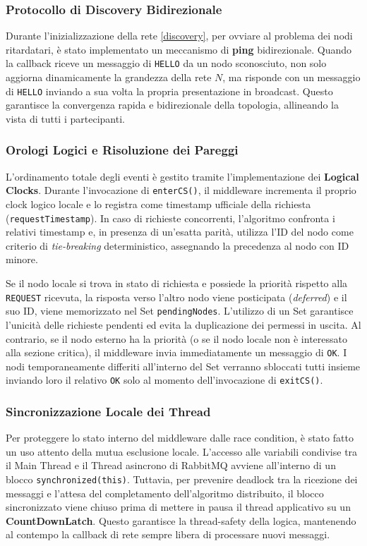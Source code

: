 \subsubsection{Protocollo di Discovery Bidirezionale}
Durante l'inizializzazione della rete \ref{discovery}, per ovviare al problema dei nodi ritardatari, è stato implementato un meccanismo di \textbf{ping} bidirezionale. 
Quando la callback riceve un messaggio di \texttt{HELLO} da un nodo sconosciuto, non solo aggiorna dinamicamente la grandezza della rete $N$, ma risponde con un messaggio di \texttt{HELLO} inviando a sua volta la propria presentazione in broadcast. Questo garantisce la convergenza rapida e bidirezionale della topologia, allineando la vista di tutti i partecipanti.

\subsubsection{Orologi Logici e Risoluzione dei Pareggi}
L'ordinamento totale degli eventi è gestito tramite l'implementazione dei \textbf{Logical Clocks}. Durante l'invocazione di \texttt{enterCS()}, il middleware incrementa il proprio clock logico locale e lo registra come timestamp ufficiale della richiesta (\texttt{requestTimestamp}). In caso di richieste concorrenti, l'algoritmo confronta i relativi timestamp e, in presenza di un'esatta parità, utilizza l'ID del nodo come criterio di \textit{tie-breaking} deterministico, assegnando la precedenza al nodo con ID minore. 

Se il nodo locale si trova in stato di richiesta e possiede la priorità rispetto alla \texttt{REQUEST} ricevuta, la risposta verso l'altro nodo viene posticipata (\textit{deferred}) e il suo ID, viene memorizzato nel Set \texttt{pendingNodes}. L'utilizzo di un Set garantisce l'unicità delle richieste pendenti ed evita la duplicazione dei permessi in uscita. Al contrario, se il nodo esterno ha la priorità (o se il nodo locale non è interessato alla sezione critica), il middleware invia immediatamente un messaggio di \texttt{OK}. I nodi temporaneamente differiti all'interno del Set verranno sbloccati tutti insieme inviando loro il relativo \texttt{OK} solo al momento dell'invocazione di \texttt{exitCS()}.

\subsubsection{Sincronizzazione Locale dei Thread}
Per proteggere lo stato interno del middleware dalle race condition, è stato fatto un uso attento della mutua esclusione locale. L'accesso alle variabili condivise tra il Main Thread e il Thread asincrono di RabbitMQ avviene all'interno di un blocco \texttt{synchronized(this)}. Tuttavia, per prevenire deadlock tra la ricezione dei messaggi e l'attesa del completamento dell'algoritmo distribuito, il blocco sincronizzato viene chiuso prima di mettere in pausa il thread applicativo su un \textbf{CountDownLatch}. Questo garantisce la thread-safety della logica, mantenendo al contempo la callback di rete sempre libera di processare nuovi messaggi.